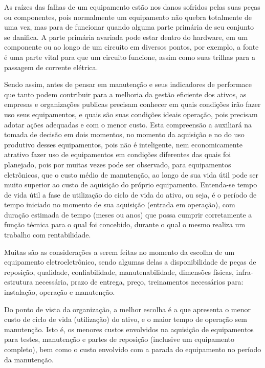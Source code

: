 As raízes das falhas de um equipamento estão nos danos sofridos pelas suas peças ou componentes, pois normalmente um equipamento não quebra totalmente de uma vez, mas para de funcionar quando alguma parte primária de seu conjunto se danifica. A parte primária avariada pode estar dentro do hardware, em um componente ou ao longo de um circuito em diversos pontos, por exemplo, a fonte é uma parte vital para que um circuito funcione, assim como suas trilhas para a passagem de corrente elétrica.

Sendo assim, antes de pensar em manutenção e seus indicadores de performace que tanto podem contribuir para a melhoria da gestão eficiente dos ativos, as empresas e organizações publicas precisam conhecer em quais condições irão fazer uso seus equipamentos, e quais são suas condições ideais operação, pois precisam adotar ações adequadas e com o menor custo. Esta compreensão a auxiliará na tomada de decisão em dois momentos, no momento da aquisição e no do uso produtivo desses equipamentos, pois não é inteligente, nem economicamente atrativo fazer uso de equipamentos em condições diferentes das quais foi planejado, pois por muitas vezes pode ser observado, para equipamentos eletrônicos, que o custo médio de manutenção, ao longo de sua vida útil pode ser muito superior ao custo de aquisição do próprio equipamento. Entenda-se tempo de vida útil a fase de utilização do ciclo de vida do ativo, ou seja, é o período de tempo iniciado no momento de sua aquisição (entrada em operação), com duração estimada de tempo (meses ou anos) que possa cumprir corretamente a função técnica para o qual foi concebido, durante o qual o mesmo realiza um trabalho com rentabilidade. 

Muitas são as considerações a serem feitas no momento da escolha de um equipamento eletroeletrônico, sendo algumas delas a disponibilidade de peças de reposição, qualidade, confiabilidade, manutenabilidade, dimensões físicas, infra-estrutura necessária, prazo de entrega, preço, treinamentos necessários para: instalação, operação e manutenção. 

Do ponto de vista da organização, a melhor escolha é a que apresenta o menor custo de ciclo de vida (utilização) do ativo, e o maior tempo de operação sem manutenção. Isto é, os menores custos envolvidos na aquisição de equipamentos para testes, manutenção e partes de reposição (inclusive um equipamento completo), bem como o custo envolvido com a parada do equipamento no período da manutenção.
